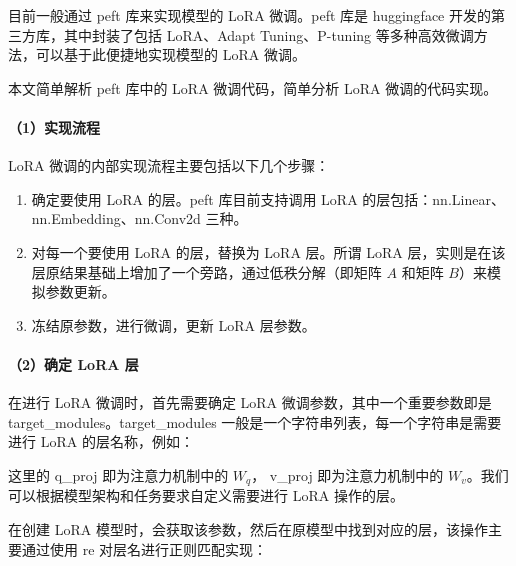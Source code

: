 \documentclass[12pt,a4paper]{book}
\begin{document}
目前一般通过 peft 库来实现模型的 LoRA 微调。peft 库是 huggingface
开发的第三方库，其中封装了包括 LoRA、Adapt Tuning、P-tuning
等多种高效微调方法，可以基于此便捷地实现模型的 LoRA 微调。

本文简单解析 peft 库中的 LoRA 微调代码，简单分析 LoRA 微调的代码实现。

\paragraph{（1）实现流程}\label{ux5b9eux73b0ux6d41ux7a0b}

LoRA 微调的内部实现流程主要包括以下几个步骤：

\begin{enumerate}
\def\labelenumi{\arabic{enumi}.}
\item
  确定要使用 LoRA 的层。peft 库目前支持调用 LoRA
  的层包括：nn.Linear、nn.Embedding、nn.Conv2d 三种。
\item
  对每一个要使用 LoRA 的层，替换为 LoRA 层。所谓 LoRA
  层，实则是在该层原结果基础上增加了一个旁路，通过低秩分解（即矩阵 \(A\)
  和矩阵 \(B\)）来模拟参数更新。
\item
  冻结原参数，进行微调，更新 LoRA 层参数。
\end{enumerate}

\paragraph{（2）确定 LoRA 层}\label{ux786eux5b9a-lora-ux5c42}

在进行 LoRA 微调时，首先需要确定 LoRA 微调参数，其中一个重要参数即是
target\_modules。target\_modules
一般是一个字符串列表，每一个字符串是需要进行 LoRA 的层名称，例如：

\begin{Shaded}
\begin{Highlighting}[]
\OperatorTok{=}\NormalTok{ [}\NormalTok{,}\NormalTok{]}
\end{Highlighting}
\end{Shaded}

这里的 q\_proj 即为注意力机制中的 \(W_q\)， v\_proj 即为注意力机制中的
\(W_v\)。我们可以根据模型架构和任务要求自定义需要进行 LoRA 操作的层。

在创建 LoRA
模型时，会获取该参数，然后在原模型中找到对应的层，该操作主要通过使用 re
对层名进行正则匹配实现：

\begin{Shaded}
\begin{Highlighting}[]
\OperatorTok{=}
\end{Highlighting}
\end{Shaded}
\end{document}
